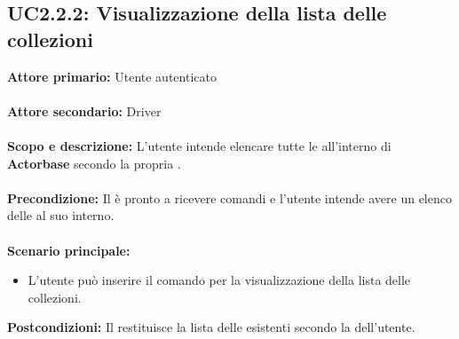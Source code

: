 \documentclass{scalatekids-article}
\begin{document}
\subsection{UC2.2.2: Visualizzazione della lista delle collezioni}

\textbf{Attore primario:} Utente autenticato\\ \\
\textbf{Attore secondario:} Driver\\ \\
\textbf{Scopo e descrizione:} L'utente intende elencare tutte le  all'interno di \textbf{Actorbase} secondo la propria .\\ \\
\textbf{Precondizione:} Il  è pronto a ricevere comandi e l'utente intende avere un elenco delle  al suo interno.\\ \\
\textbf{Scenario principale:}
\begin{itemize}
\item L'utente può inserire il comando per la visualizzazione della lista delle collezioni.
\end{itemize}
\textbf{Postcondizioni:} Il  restituisce la lista delle  esistenti secondo la  dell'utente.
\end{document}
